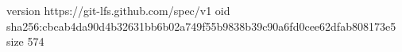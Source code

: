 version https://git-lfs.github.com/spec/v1
oid sha256:cbcab4da90d4b32631bb6b02a749f55b9838b39c90a6fd0cee62dfab808173e5
size 574

